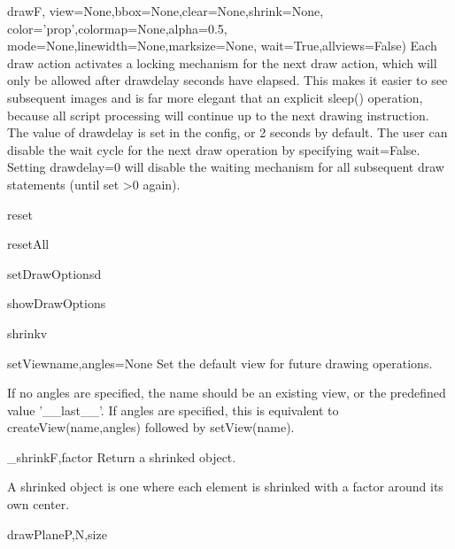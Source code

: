 \begin{funcdesc}{draw}{F, 
    view=None,bbox=None,clear=None,shrink=None,
    color='prop',colormap=None,alpha=0.5,
    mode=None,linewidth=None,marksize=None,
    wait=True,allviews=False)}
Each draw action activates a locking mechanism for the next draw action,
which will only be allowed after drawdelay seconds have elapsed. This
makes it easier to see subsequent images and is far more elegant that an
explicit sleep() operation, because all script processing will continue
up to the next drawing instruction.
The value of drawdelay is set in the config, or 2 seconds by default.
The user can disable the wait cycle for the next draw operation by
specifying wait=False. Setting drawdelay=0 will disable the waiting
mechanism for all subsequent draw statements (until set >0 again).

\end{funcdesc}

\begin{funcdesc}{reset}{}
\end{funcdesc}

\begin{funcdesc}{resetAll}{}
\end{funcdesc}

\begin{funcdesc}{setDrawOptions}{d}
\end{funcdesc}

\begin{funcdesc}{showDrawOptions}{}
\end{funcdesc}

\begin{funcdesc}{shrink}{v}
\end{funcdesc}

\begin{funcdesc}{setView}{name,angles=None}
Set the default view for future drawing operations.

If no angles are specified, the name should be an existing view, or
the predefined value '__last__'.
If angles are specified, this is equivalent to createView(name,angles)
followed by setView(name).

\end{funcdesc}

\begin{funcdesc}{_shrink}{F,factor}
Return a shrinked object.

A shrinked object is one where each element is shrinked with a factor
around its own center.

\end{funcdesc}

\begin{funcdesc}{drawPlane}{P,N,size}
\end{funcdesc}

